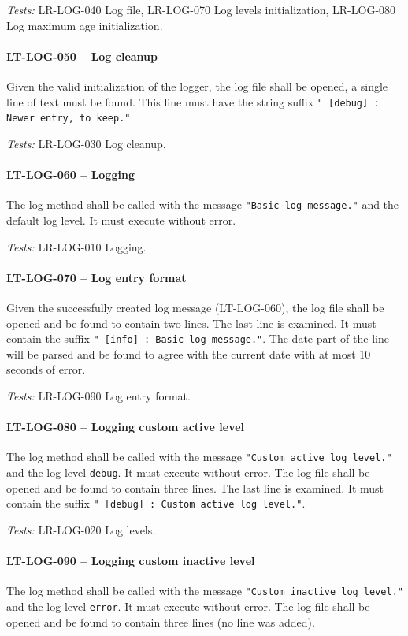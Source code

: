 \textit{Tests: } LR-LOG-040 Log file, LR-LOG-070 Log levels initialization,
                 LR-LOG-080 Log maximum age initialization.

\paragraph{LT-LOG-050 -- Log cleanup}
Given the valid initialization of the logger, the log file
shall be opened, a single line of text must be found.
This line must have the string suffix
\lstinline{" [debug] : Newer entry, to keep."}.

\textit{Tests: } LR-LOG-030 Log cleanup.

\paragraph{LT-LOG-060 -- Logging}
The log method shall be called with the message
\lstinline{"Basic log message."} and the default log level.
It must execute without error.

\textit{Tests: } LR-LOG-010 Logging.

\paragraph{LT-LOG-070 -- Log entry format}
Given the successfully created log message (LT-LOG-060),
the log file shall be opened and be found to contain two lines.
The last line is examined. It must contain the suffix
\lstinline{" [info] : Basic log message."}.
The date part of the line will be parsed and be found to agree
with the current date with at most 10 seconds of error.

\textit{Tests: } LR-LOG-090 Log entry format.

\paragraph{LT-LOG-080 -- Logging custom active level}
The log method shall be called with the message
\lstinline{"Custom active log level."} and the log level
\lstinline{debug}. It must execute without error.
The log file shall be opened and be found to contain three lines.
The last line is examined. It must contain the suffix
\lstinline{" [debug] : Custom active log level."}.

\textit{Tests: } LR-LOG-020 Log levels.

\paragraph{LT-LOG-090 -- Logging custom inactive level}
The log method shall be called with the message
\lstinline{"Custom inactive log level."} and the log level
\lstinline{error}. It must execute without error.
The log file shall be opened and be found to contain three lines
(no line was added).

